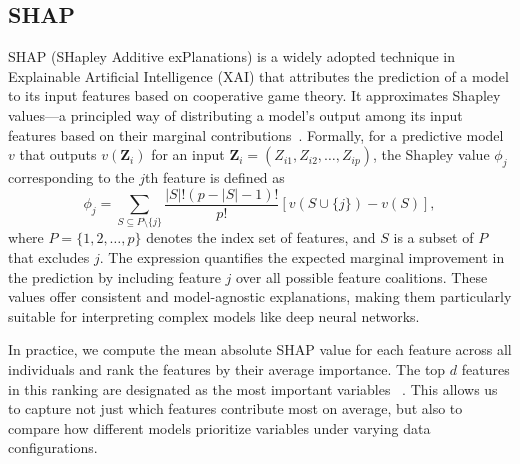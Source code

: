 \documentclass{article}
\theoremstyle{plain}
\theoremstyle{definition}
\theoremstyle{remark}
\begin{document}
\subsection{SHAP}
SHAP (SHapley Additive exPlanations) is a widely adopted technique in Explainable Artificial Intelligence (XAI) that attributes the prediction of a model to its input features based on cooperative game theory. It approximates Shapley values---a principled way of distributing a model’s output among its input features based on their marginal contributions~\cite{lundberg2017unified, vo2024explainability}. Formally, for a predictive model $v$ that outputs $v(\bm{Z}_i)$ for an input $\bm{Z}_i = (Z_{i1}, Z_{i2}, \dots, Z_{ip})$, the Shapley value $\phi_j$ corresponding to the $j$th feature is defined as
\begin{equation}
    \phi_j = \sum_{S \subseteq P \setminus \{j\}} \frac{|S|! (p - |S| - 1)!}{p!} \left[ v(S \cup \{j\}) - v(S) \right],
\end{equation}
where $P = \{1, 2, \dots, p\}$ denotes the index set of features, and $S$ is a subset of $P$ that excludes $j$. The expression quantifies the expected marginal improvement in the prediction by including feature $j$ over all possible feature coalitions. These values offer consistent and model-agnostic explanations, making them particularly suitable for interpreting complex models like deep neural networks.

In practice, we compute the mean absolute SHAP value for each feature across all individuals and rank the features by their average importance. The top $d$ features in this ranking are designated as the most important variables ~\cite{marcilio2020explanations}. This allows us to capture not just which features contribute most on average, but also to compare how different models prioritize variables under varying data configurations.
\end{document}
